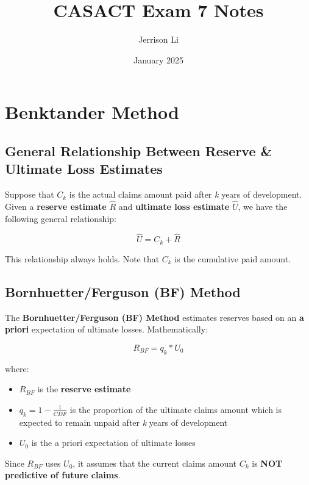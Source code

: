 \documentclass{article}
\title{CASACT Exam 7 Notes}
\author{Jerrison Li }
\date{January 2025}
\begin{document}
\maketitle

\section{Benktander Method}

\subsection{General Relationship Between Reserve \& Ultimate Loss Estimates }

Suppose that $C_k$ is the actual claims amount paid after \textit{k} years of
development. Given a \textbf{reserve estimate} $\widehat{R}$ and
\textbf{ultimate loss estimate} $\widehat{U}$, we have the following general
relationship:

\begin{equation}
  \widehat{U} = C_k + \widehat{R}
\end{equation}

This relationship always holds. Note that $C_k$ is the cumulative paid amount.

\subsection{Bornhuetter/Ferguson (BF) Method }

The \textbf{Bornhuetter/Ferguson (BF) Method} estimates reserves based on an
\textbf{a priori} expectation of ultimate losses. Mathematically:

\begin{equation}
  R_{BF} = q_k * U_0
\end{equation}

where:

\begin{itemize}
  \item $R_{BF}$ is the \textbf{reserve estimate}
  \item $q_k = 1 - \frac{1}{CDF}$ is the proportion of the ultimate claims
    amount which is expected to remain unpaid after \textit{k} years
    of development
  \item $U_0$ is the a priori expectation of ultimate losses
\end{itemize}

\bigskip

Since $R_{BF}$ uses $U_0$, it assumes that the current claims amount $C_k$ is
\textbf{NOT predictive of future claims}.
\end{document}
